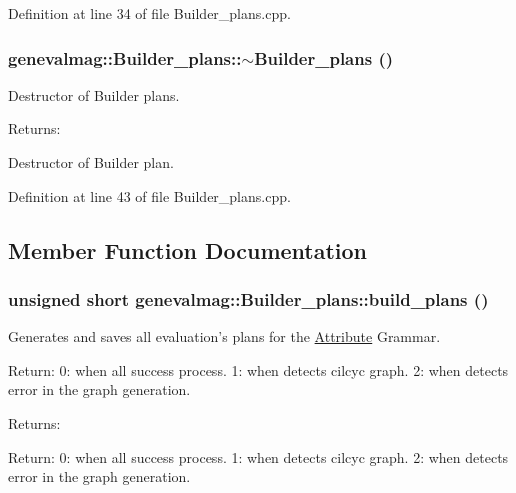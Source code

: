 Definition at line 34 of file Builder\_\-plans.cpp.\hypertarget{classgenevalmag_1_1Builder__plans_f19ca3bf57580ee40b317e119cacdc66}{
\subsubsection[{$\sim$Builder\_\-plans}]{\setlength{\rightskip}{0pt plus 5cm}genevalmag::Builder\_\-plans::$\sim$Builder\_\-plans ()}}
\label{classgenevalmag_1_1Builder__plans_f19ca3bf57580ee40b317e119cacdc66}


Destructor of Builder plans. \begin{Desc}
\item[Returns:]\end{Desc}
Destructor of Builder plan. 

Definition at line 43 of file Builder\_\-plans.cpp.

\subsection{Member Function Documentation}
\hypertarget{classgenevalmag_1_1Builder__plans_3337ccac1c358d9b0a1de456ff74b0cb}{
\subsubsection[{build\_\-plans}]{\setlength{\rightskip}{0pt plus 5cm}unsigned short genevalmag::Builder\_\-plans::build\_\-plans ()}}
\label{classgenevalmag_1_1Builder__plans_3337ccac1c358d9b0a1de456ff74b0cb}


Generates and saves all evaluation's plans for the \hyperlink{classgenevalmag_1_1Attribute}{Attribute} Grammar.

Return: 0: when all success process. 1: when detects cilcyc graph. 2: when detects error in the graph generation. \begin{Desc}
\item[Returns:]\end{Desc}
Return: 0: when all success process. 1: when detects cilcyc graph. 2: when detects error in the graph generation. 

